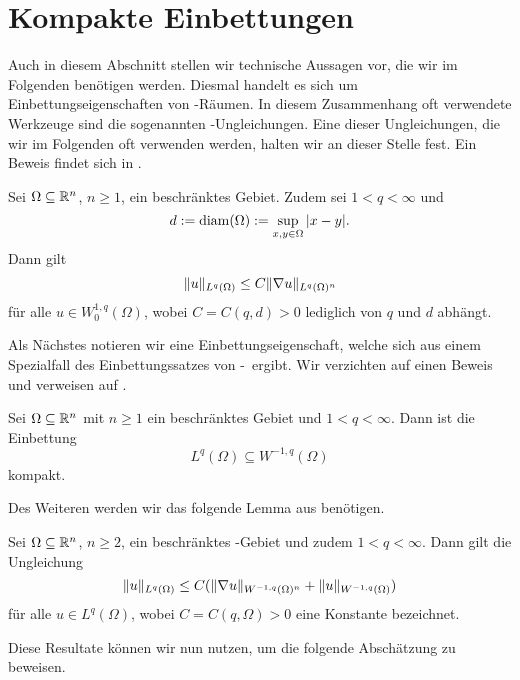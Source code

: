 \section{Kompakte Einbettungen}

Auch in diesem Abschnitt stellen wir technische Aussagen vor, die wir im Folgenden benötigen werden.
Diesmal handelt es sich um Einbettungseigenschaften von \sobolev\hyp{}Räumen.
In diesem Zusammenhang oft verwendete Werkzeuge sind die sogenannten \poincare\hyp{}Ungleichungen.
Eine dieser Ungleichungen, die wir im Folgenden oft verwenden werden, halten wir an dieser Stelle fest. Ein Beweis findet sich in \cite[S.183, Theorem 6.30]{adams2003sobolev}.

\begin{lem}
  \label{lem:poincare}
  Sei $\Omega \subseteq \mathbb{R}^n$, $n \geq 1$, ein beschränktes Gebiet.
  Zudem sei $1 < q < \infty$ und 
  $$
  d := \operatorname{diam}(\Omega) := \sup_{x, y \in \Omega} | x - y |.
  $$
  Dann gilt
  $$
  \lVert u \rVert_{L^q(\Omega)} \leq C \lVert \nabla u \rVert_{L^q(\Omega)^n}
  $$
  für alle $u \in W_0^{1,q}(\Omega)$, wobei $C = C(q,d) > 0$ lediglich von $q$ und $d$ abhängt. 
\end{lem}

Als Nächstes notieren wir eine Einbettungseigenschaft, welche sich aus einem Spezialfall des Einbettungssatzes von \rellich\hyp{}\kondrachov\ ergibt. 
Wir verzichten auf einen Beweis und verweisen auf \cite[S.168, Theorem 6.3]{adams2003sobolev}.

\begin{lem}
  \label{lem:compactEmbedding0}
  Sei $\Omega \subseteq \mathbb{R}^n$ mit $n \geq 1$ ein beschränktes Gebiet und $1 < q < \infty$.
  Dann ist die Einbettung
  $$
  L^q(\Omega) \subseteq W^{-1,q}(\Omega)
  $$
  kompakt.
\end{lem}

Des Weiteren werden wir das folgende Lemma aus \cite[S.186, Lemma 7.1]{necas2012direct} benötigen.
\begin{lem}
  \label{lem:necas}
  Sei $\Omega \subseteq \mathbb{R}^n$, $n \geq 2$, ein beschränktes \lipschitz\hyp{}Gebiet und zudem $1 < q < \infty$.
  Dann gilt die Ungleichung
  $$
  \lVert u \rVert_{L^q(\Omega)} \leq C(\lVert \nabla u \rVert_{W^{-1,q}(\Omega)^n} + \lVert u \rVert_{W^{-1,q}(\Omega)})
  $$
  für alle $u \in L^q(\Omega)$, wobei $C = C(q, \Omega) > 0$ eine Konstante bezeichnet.
\end{lem}

Diese Resultate können wir nun nutzen, um die folgende Abschätzung zu beweisen.

